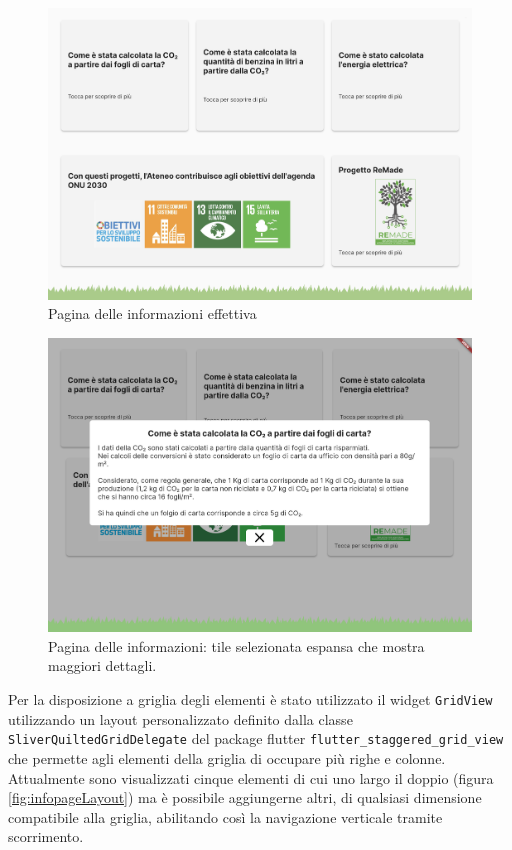 \begin{figure}[h]
  \centering
  \includegraphics[width=\textwidth]{img/totem/screenshot/infoPageScreen.png}
  \caption{Pagina delle informazioni effettiva}
  \label{fig:infoPage}
\end{figure}
\begin{figure}[h]
  \centering
  \includegraphics[width=\textwidth]{img/totem/screenshot/infoPagePopupScreen.png}
  \caption{Pagina delle informazioni: tile selezionata espansa che mostra maggiori dettagli.}
  \label{fig:infoPagePopup}
\end{figure}

Per la disposizione a griglia degli elementi è stato utilizzato il widget \texttt{GridView} utilizzando un layout personalizzato definito dalla classe \texttt{SliverQuiltedGridDelegate} del package flutter \texttt{flutter\_staggered\_grid\_view} \cite{staggeredGridView} che permette agli elementi della griglia di occupare più righe e colonne.
Attualmente sono visualizzati cinque elementi di cui uno largo il doppio (figura \ref{fig:infopageLayout}) ma è possibile aggiungerne altri, di qualsiasi dimensione compatibile alla griglia, abilitando così la navigazione verticale tramite scorrimento.

